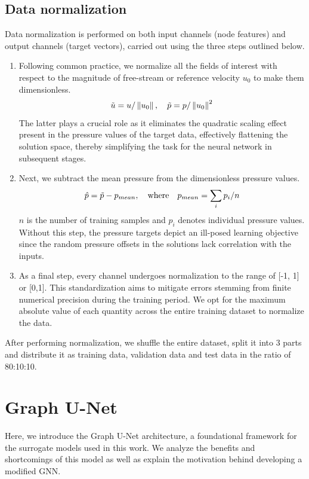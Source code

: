 \subsection{Data normalization}
Data normalization is performed on both input channels (node features) and output channels (target vectors), carried out using the three steps outlined below.
\begin{enumerate}
\item Following common practice, we normalize all the fields of interest with respect to the magnitude of free-stream or reference velocity $u_0$ to make them dimensionless. 
\begin{equation}
    \Tilde{u}=u /\left\|u_0\right\|, \quad \Tilde{p}=p /\left\|u_0\right\|^2
\end{equation}
The latter plays a crucial role as it eliminates the quadratic scaling effect present in the pressure values of the target data, effectively flattening the solution space, thereby simplifying the task for the neural network in subsequent stages.
\item Next, we subtract the mean pressure from the dimensionless pressure values. 
\begin{equation}
\hat{p} = \Tilde{p} - p_{mean} , \quad \text{where} \quad p_{mean} = \sum_i p_i / n
\end{equation}
$n$ is the number of training samples and $p_i$ denotes individual pressure values. Without this step, the pressure targets depict an ill-posed learning objective since the random pressure offsets in the solutions lack correlation with the inputs.
\item As a final step, every channel undergoes normalization to the range of [-1, 1] or [0,1]. This standardization aims to mitigate errors stemming from finite numerical precision during the training period. We opt for the maximum absolute value of each quantity across the entire training dataset to normalize the data. 
\end{enumerate}
After performing normalization, we shuffle the entire dataset, split it into 3 parts and distribute it as training data, validation data and test data in the ratio of 80:10:10. 
\section{Graph U-Net}
Here, we introduce the Graph U-Net architecture, a foundational framework for the surrogate models used in this work. We analyze the benefits and shortcomings of this model as well as explain the motivation behind developing a modified GNN.


